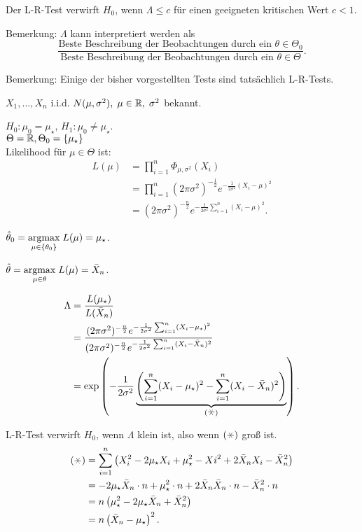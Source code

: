 \documentclass{tstextbook}
\begin{document}
Der L-R-Test verwirft $ H_0 $, wenn $ \Lambda\le c $ für einen geeigneten kritischen Wert $ c<1 $.

\begin{remark}
	Bemerkung: $ \Lambda $ kann interpretiert werden als 
	\[
	\frac{\text{Beste Beschreibung der Beobachtungen durch ein }\theta\in\Theta_0}{\text{Beste Beschreibung der Beobachtungen durch ein }\theta\in\Theta}.
	\]
\end{remark}

\begin{remark}
	Bemerkung: Einige der bisher vorgestellten Tests sind tatsächlich L-R-Tests.
\end{remark}

\begin{example}
	$ X_1,\ldots,X_n $ i.i.d. $ N(\mu,\sigma^2), \; \mu\in\mathbb R, \; \sigma^2 $ bekannt. 
	
	$ H_0\colon\mu_0 =\mu_\star $, 
	$ H_1\colon\mu_0 \ne\mu_\star $. \\
	$ \Theta = \mathbb R, \Theta_0 = \{ \mu_\star \} $ \\ 
	
	Likelihood für $\mu \in \Theta $ ist: 
	\[
	\begin{aligned}
		L(\mu) & = \prod_{i=1}^{n}\Phi_{\mu,\sigma^2}(X_i) \\
		& = \prod_{i=1}^{n}(2\pi\sigma^2)^{-\frac{1}{2}} e^{-\frac{1}{2\sigma^2}(X_i-\mu)^2} \\
		& = (2\pi\sigma^2)^{-\frac{n}{2}} e^{-\frac{1}{2\sigma^2}\sum_{i=1}^{n}(X_i-\mu)^2} .
	\end{aligned}
	\]
	
	$ \hat{\theta}_0 = \underset{\mu\in\lbrace\theta_0\rbrace}{\operatorname{argmax}} \; L(\mu) = \mu_\star $. 
	
	$ \hat{\theta} = \underset{\mu\in\theta}{\operatorname{argmax}} \; L(\mu) = \bar{X}_n $.
	
	\[
	\begin{aligned}
		\Lambda & = \frac{L(\mu_\star)}{L(\bar{X}_n)} \\
		& = \frac{(2\pi\sigma^2)^{-\frac{n}{2}} e^{-\frac{1}{2\sigma^2}\sum_{i=1}^{n}(X_i-\mu_\star)^2}}{(2\pi\sigma^2)^{-\frac{n}{2}} e^{-\frac{1}{2\sigma^2}\sum_{i=1}^{n}(X_i-\bar{X}_n)^2}} \\
		& = \exp\left(-\frac{1}{2\sigma^2}\underbrace{\left(\sum_{i=1}^{n}(X_i-\mu_\star)^2-\sum_{i=1}^{n}(X_i-\bar{X}_n)^2\right)}_{(\hexstar)}\right).
	\end{aligned}
	\]
	
	L-R-Test verwirft $ H_0 $, wenn $ \Lambda $ klein ist, also wenn $ (\hexstar) $ groß ist. 
	\[
	\begin{aligned}
		(\hexstar) & = \sum_{i=1}^{n}\left(X_i^2-2\mu_\star X_i+\mu_\star ^2-Xi^2+2\bar{X}_n X_i -\bar{X}_n^2\right) \\
		& = -2\mu_\star \bar{X}_n\cdot n + \mu_\star ^2\cdot n + 2\bar{X}_n\bar{X}_n\cdot n -\bar{X}_n^2\cdot n \\
		& = n\left(\mu_\star ^2-2\mu_\star \bar{X}_n+\bar{X}_n^2\right) \\
		& = n\left(\bar{X}_n-\mu_\star \right)^2.
	\end{aligned}
	\]
	

\end{example}
\end{document}
